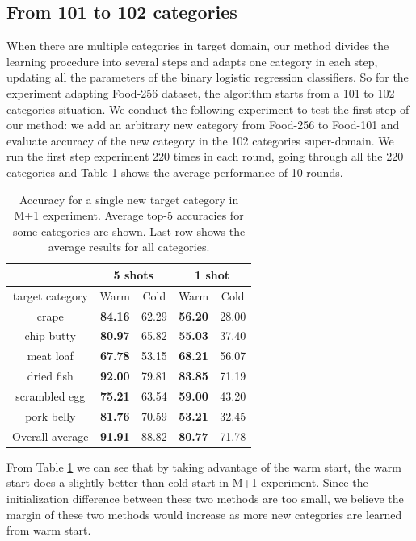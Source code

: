\subsection{From 101 to 102 categories}
When there are multiple categories in target domain, our method divides the learning procedure into several steps and adapts one category in each step, updating all the parameters of the binary logistic regression classifiers. So for the experiment adapting Food-256 dataset, the algorithm starts from a 101 to 102 categories situation. We conduct the following experiment to test the first step of our method: we add an arbitrary new category from Food-256 to Food-101 and evaluate accuracy of the new category in the 102 categories super-domain. We run the first step experiment 220 times in each round, going through all the 220 categories and Table \ref{tab:N+1} shows the average performance of 10 rounds.

\begin{table}[htbp]
  \centering
  \caption{Accuracy for a single new target category in M+1 experiment. Average top-5 accuracies for some categories are shown. Last row shows the average results for all categories.}
    \begin{tabular}{c|cc|cc}
    \toprule
          & \multicolumn{2}{c|}{5 shots} & \multicolumn{2}{c}{1 shot} \\
    \midrule
       target category   & \multicolumn{1}{c}{Warm} & \multicolumn{1}{c|}{Cold} & \multicolumn{1}{c}{Warm} & \multicolumn{1}{c}{Cold} \\
        \midrule
    crape & \textbf{84.16} & 62.29 & \textbf{56.20}  & 28.00 \\
   chip butty & \textbf{80.97} & 65.82 & \textbf{55.03} & 37.40 \\
    meat loaf & \textbf{67.78} & 53.15 & \textbf{68.21} & 56.07 \\
    dried fish & \textbf{92.00}    & 79.81 &\textbf{83.85} & 71.19 \\
   scrambled egg & \textbf{75.21} & 63.54 & \textbf{59.00}    & 43.20 \\
    pork belly & \textbf{81.76 }& 70.59 &\textbf{53.21} & 32.45 \\
    \midrule
    Overall average &\textbf{91.91}&88.82  & \textbf{80.77} & 71.78 \\
    \bottomrule
    \end{tabular}%
  \label{tab:N+1}%
\end{table}%
From Table \ref{tab:N+1} we can see that by taking advantage of the warm start, the warm start does a slightly better than cold start in M+1 experiment. Since the initialization difference between these two methods are too small, we believe the margin of these two methods would increase as more new categories are learned from warm start.
